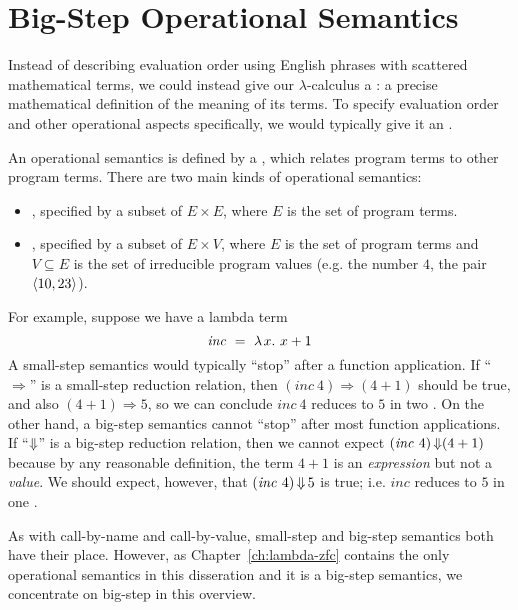 \section{Big-Step Operational Semantics}

Instead of describing evaluation order using English phrases with scattered mathematical terms, we could instead give our $\lambda$-calculus a : a precise mathematical definition of the meaning of its terms.
To specify evaluation order and other operational aspects specifically, we would typically give it an .

An operational semantics is defined by a , which relates program terms to other program terms.
There are two main kinds of operational semantics:
\begin{itemize}
	\item {}, specified by a subset of $E \times E$, where $E$ is the set of program terms.
	\item {}, specified by a subset of $E \times V$, where $E$ is the set of program terms and $V \subseteq E$ is the set of irreducible program values (e.g. the number $4$, the pair $\langle{10,23}\rangle$).
\end{itemize}
For example, suppose we have a lambda term
\begin{equation}
	\mathit{inc}\ =\ \lambda\mspace{2mu}{x}\ldotp\, x + 1
\end{equation}
A small-step semantics would typically ``stop'' after a function application.
If ``$\Rightarrow$'' is a small-step reduction relation, then $(\mathit{inc}~4) \Rightarrow (4 + 1)$ should be true, and also $(4 + 1) \Rightarrow 5$, so we can conclude $\mathit{inc}~4$ reduces to $5$ in two .
On the other hand, a big-step semantics cannot ``stop'' after most function applications.
If ``$\operatorname{\Downarrow}$'' is a big-step reduction relation, then we cannot expect $(\mathit{inc}~4) \operatorname{\Downarrow} (4 + 1)$ because by any reasonable definition, the term $4 + 1$ is an \emph{expression} but not a \emph{value}.
We should expect, however, that $(\mathit{inc}~4) \operatorname{\Downarrow} 5$ is true; i.e. $\mathit{inc}$ reduces to $5$ in one .

As with call-by-name and call-by-value, small-step and big-step semantics both have their place.
However, as Chapter~\ref{ch:lambda-zfc} contains the only operational semantics in this disseration and it is a big-step semantics, we concentrate on big-step in this overview.

